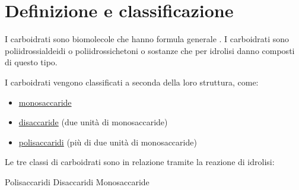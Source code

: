\section{Definizione e classificazione}
I carboidrati sono biomolecole che hanno formula generale . I carboidrati sono poliidrossialdeidi o poliidrossichetoni o sostanze che per idrolisi danno composti di questo tipo.

I carboidrati vengono classificati a seconda della loro struttura, come:
\begin{itemize}
	\item \hyperref[sec:monosaccardi]{monosaccaride}
	\item \hyperref[sec:disaccaridi]{disaccaride} (due unità di monosaccaride)
	\item \hyperref[sec:polisaccaridi]{polisaccaridi} (più di due unità di monosaccaride)
\end{itemize}
Le tre classi di carboidrati sono in relazione tramite la reazione di idrolisi:
\begin{reaction}
	Polisaccaridi \arrow{->[\ch{H2O}][\Hpiu{1}]}
	Disaccaridi \arrow{->[\ch{H2O}][\Hpiu{1}]}
	Monosaccaride
\end{reaction}

